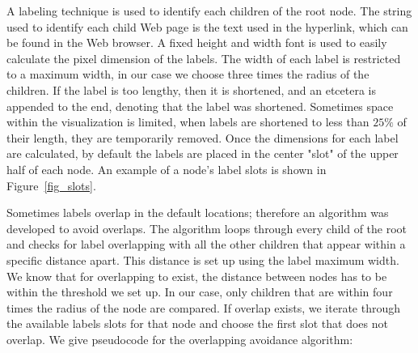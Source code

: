 \documentclass[]{article}
\begin{document}
{A labeling technique is used to identify each children of the root node.
The string used to identify each child Web page is the text used in the hyperlink, which can be found in the Web browser.
A fixed height and width font is used to easily calculate the pixel dimension of the labels.
The width of each label is restricted to a maximum width, in our case we choose three times the radius of the children.
If the label is too lengthy, then it is shortened, and an etcetera is appended to the end, denoting that the label was shortened.
Sometimes space within the visualization is limited, when labels are shortened to less than $25\%$ of their length, they are temporarily removed.
Once the dimensions for each label are calculated, by default the labels are placed in the center "slot" of the upper half of each node.
 An example of a node's label slots is shown in Figure~\ref{fig_slots}.

Sometimes labels overlap in the default locations; therefore an algorithm was developed to avoid overlaps.
The algorithm loops through every child of the root and checks for label overlapping with all the other children that appear within a specific distance apart.
This distance is set up using the label maximum width.
We know that for overlapping to exist, the distance between nodes has to be within the threshold we set up.
In our case, only children that are within four times the radius of the node are compared.
If overlap exists, we iterate through the available labels slots for that node and choose the first slot that does not overlap.
We give pseudocode for the overlapping avoidance algorithm:


}
\end{document}

